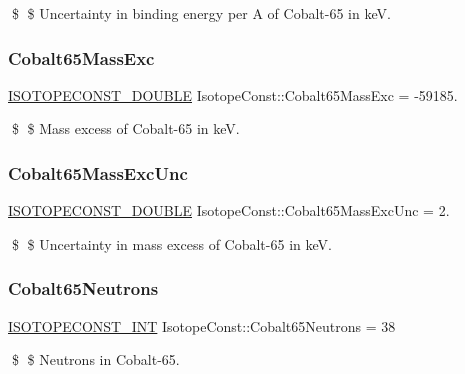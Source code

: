 \$ \$ Uncertainty in binding energy per A of Cobalt-\/65 in keV. \mbox{\label{group___isotope_const-_cobalt-_co65_gaaf073388917deea50a329f6486728585}} 
\subsubsection{\texorpdfstring{Cobalt65\+Mass\+Exc}{Cobalt65MassExc}}
{\footnotesize\ttfamily \mbox{\hyperlink{group___isotope_const-_macros_ga8f45a7272ce02c0b4c65c44636ed719a}{I\+S\+O\+T\+O\+P\+E\+C\+O\+N\+S\+T\+\_\+\+D\+O\+U\+B\+LE}} Isotope\+Const\+::\+Cobalt65\+Mass\+Exc = -\/59185.}

\$ \$ Mass excess of Cobalt-\/65 in keV. \mbox{\label{group___isotope_const-_cobalt-_co65_gae893542c2068b82aae3b23652ff2ba4a}} 
\subsubsection{\texorpdfstring{Cobalt65\+Mass\+Exc\+Unc}{Cobalt65MassExcUnc}}
{\footnotesize\ttfamily \mbox{\hyperlink{group___isotope_const-_macros_ga8f45a7272ce02c0b4c65c44636ed719a}{I\+S\+O\+T\+O\+P\+E\+C\+O\+N\+S\+T\+\_\+\+D\+O\+U\+B\+LE}} Isotope\+Const\+::\+Cobalt65\+Mass\+Exc\+Unc = 2.}

\$ \$ Uncertainty in mass excess of Cobalt-\/65 in keV. \mbox{\label{group___isotope_const-_cobalt-_co65_ga79986e88e42aac57d4e1fdc7363644ce}} 
\subsubsection{\texorpdfstring{Cobalt65\+Neutrons}{Cobalt65Neutrons}}
{\footnotesize\ttfamily \mbox{\hyperlink{group___isotope_const-_macros_ga5f18360b3e99483a35c32d789e62621c}{I\+S\+O\+T\+O\+P\+E\+C\+O\+N\+S\+T\+\_\+\+I\+NT}} Isotope\+Const\+::\+Cobalt65\+Neutrons = 38}

\$ \$ Neutrons in Cobalt-\/65. \mbox{\label{group___isotope_const-_cobalt-_co65_ga592de4d270d775fcca581a610cf30ff4}} 
